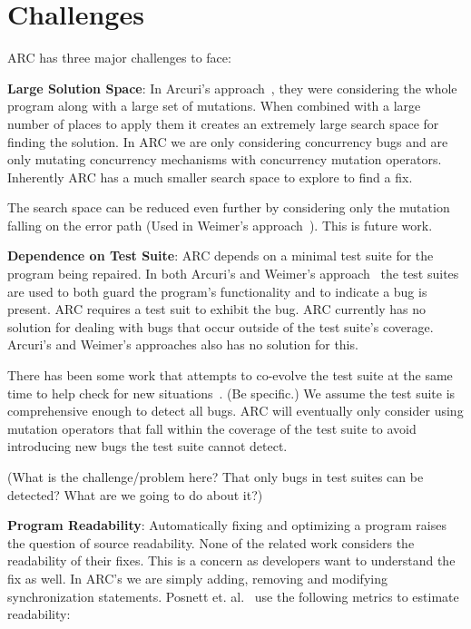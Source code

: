 \documentclass{llncs}
\begin{document}
\section{Challenges}
\label{sec:challenges}

ARC has three major challenges to face:

\textbf{Large Solution Space}: In Arcuri's approach~\cite{AY08}, they were
considering the whole program along with a large set of mutations. When
combined with a large number of places to apply them it creates an extremely
large search space for finding the solution. In ARC we are only considering
concurrency bugs and are only mutating concurrency mechanisms with concurrency
mutation operators. Inherently ARC has a much smaller search space to explore
to find a fix.

The search space can be reduced even further by considering only the mutation
falling  on the error path (Used in Weimer's approach~\cite{GNFW11}). This is
future work.

\textbf{Dependence on Test Suite}: ARC depends on a minimal test suite for the
program being repaired. In both Arcuri's and Weimer's
approach~\cite{AY08,GNFW11} the test suites are used to both guard the
program's functionality and to indicate a bug is present. ARC requires a test
suit to exhibit the bug. ARC currently has no solution for dealing with bugs
that occur outside of the test suite's coverage. Arcuri's and Weimer's
approaches also has no solution for this.

There has been some work that attempts to co-evolve the test suite at the same
time to help check for new situations~\cite{WT10}. (Be specific.) We assume the
test suite is comprehensive enough to detect all bugs. ARC will eventually only
consider using mutation operators that fall within the coverage of the test
suite to avoid introducing new bugs the test suite cannot detect.

(What is the challenge/problem here? That only bugs in test suites can be
detected? What are we going to do about it?)

\textbf{Program Readability}: Automatically fixing and optimizing a program
raises the question of source readability. None of the related work considers
the readability of their fixes. This is a concern as developers want to
understand the fix as well. In ARC's we are simply adding, removing and
modifying synchronization statements. Posnett et. al.~\cite{PHD11} use the
following metrics to estimate readability:
\end{document}
